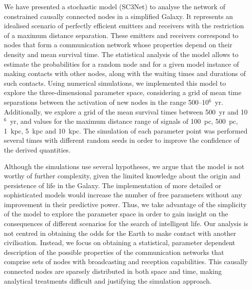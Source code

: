 \documentclass[crop]{CSLB}
\begin{document}
We have presented a stochastic model (SC3Net) to analyse the network
of constrained causally connected nodes in a simplified Galaxy.
%
It represents an idealised scenario of perfectly efficient emitters
and receivers with the restriction of a maximum distance separation.
%
These emitters and receivers correspond to nodes that form a
communication network whose properties depend on their density and
mean survival time.
%
The statistical analysis of the model allows to estimate the
probabilities for a random node and for a given model instance of
making contacts with other nodes, along with the waiting times and
durations of such contacts.
%
Using numerical simulations, we implemented this model to explore the
three-dimensional parameter space, considering a grid of mean time
separations between the activation of new nodes in the range
500--10$^6$~yr.
%
Additionally, we explore a grid of the mean survival times between
500~yr and 10$^6$~yr, and values for the maximum distance range of
signals of 100~pc, 500~pc, 1~kpc, 5~kpc and 10~kpc.
%
The simulation of each parameter point was performed several times
with different random seeds in order to improve the confidence of the
derived quantities.



Although the simulations use several hypotheses, we argue that the
model is not worthy of further complexity, given the limited knowledge
about the origin and persistence of life in the Galaxy.
%
The implementation of more detailed or sophisticated models would
increase the number of free parameters without any improvement in
their predictive power.
%
Thus, we take advantage of the simplicity of the model to explore the
parameter space in order to gain insight on the consequences of
different scenarios for the search of intelligent life.
%
Our analysis is not centred in obtaining the odds for the Earth to
make contact with another civilisation.
%
Instead, we focus on obtaining a statistical, parameter dependent
description of the possible properties of the communication networks
that comprise sets of nodes with broadcasting and reception
capabilities.
%
This causally connected nodes are sparsely distributed in both space
and time, making analytical treatments difficult and justifying the
simulation approach.
\end{document}
